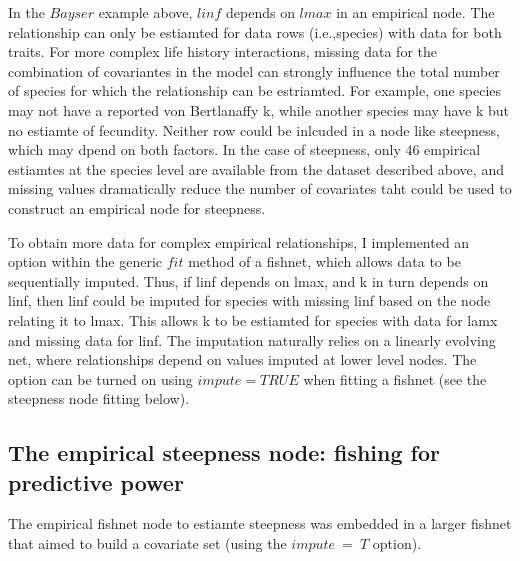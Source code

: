 \documentclass{dragonfly-report}\usepackage[]{graphicx}\usepackage[]{color}
\begin{document}
In the $Bayser$ example above, $linf$ depends on $lmax$ in an empirical node. The relationship can only be estiamted for data rows (i.e.,species) with data for both traits. For more complex life history interactions, missing data for the combination of covariantes in the model can strongly influence the total number of species for which the relationship can be estriamted. For example, one species may not have a reported von Bertlanaffy k, while another species may have k but no estiamte of fecundity. Neither row could be inlcuded in a node like steepness, which may dpend on both factors. In the case of steepness, only 46 empirical estiamtes at the species level are available from the dataset described above, and missing values dramatically reduce the number of covariates taht could be used to construct an empirical node for steepness.

To obtain more data for complex empirical relationships, I implemented an option within the generic $fit$ method of a fishnet, which allows data to be sequentially imputed. Thus, if linf depends on lmax, and k in turn depends on linf, then linf could be imputed for species with missing linf based on the node relating it to lmax. This allows k to be estiamted for species with data for lamx and missing data for linf. The imputation naturally relies on a linearly evolving net, where relationships depend on  values imputed at lower level nodes. The option can be turned on using $impute = TRUE$ when fitting a fishnet (see the steepness node fitting below).

\subsection{The empirical steepness node: fishing for predictive power}

The empirical fishnet node to estiamte steepness was embedded in a larger fishnet that aimed to build a covariate set (using the $impute~=~T$ option).
\end{document}
